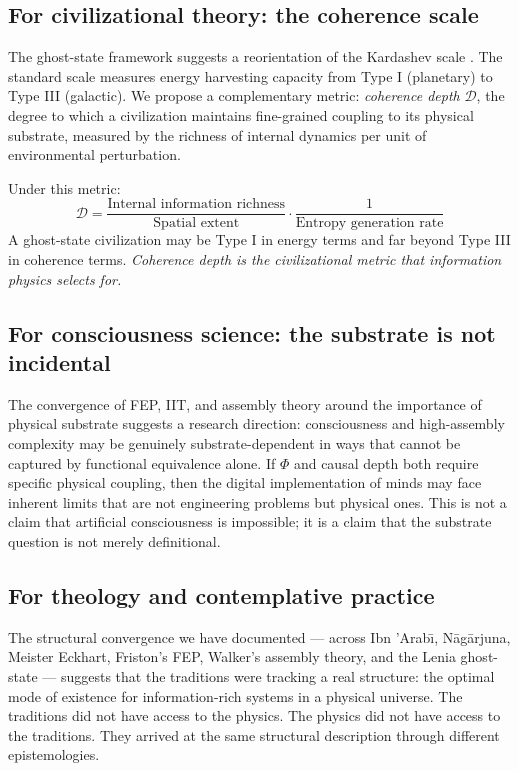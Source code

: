 \documentclass[12pt, a4paper]{article}
\begin{document}
\subsection{For civilizational theory: the coherence scale}

The ghost-state framework suggests a reorientation of the Kardashev scale \citep{kardashev1964}.
The standard scale measures energy harvesting capacity from Type I (planetary) to Type III
(galactic). We propose a complementary metric: \textit{coherence depth} $\mathcal{D}$, the
degree to which a civilization maintains fine-grained coupling to its physical substrate,
measured by the richness of internal dynamics per unit of environmental perturbation.

Under this metric:
\[
\mathcal{D} = \frac{\text{Internal information richness}}{\text{Spatial extent}} \cdot
\frac{1}{\text{Entropy generation rate}}
\]
A ghost-state civilization may be Type I in energy terms and far beyond Type III in coherence
terms. \textit{Coherence depth is the civilizational metric that information physics selects
for.}

\subsection{For consciousness science: the substrate is not incidental}

The convergence of FEP, IIT, and assembly theory around the importance of physical substrate
suggests a research direction: consciousness and high-assembly complexity may be genuinely
substrate-dependent in ways that cannot be captured by functional equivalence alone. If
$\Phi$ and causal depth both require specific physical coupling, then the digital
implementation of minds may face inherent limits that are not engineering problems but
physical ones. This is not a claim that artificial consciousness is impossible; it is a claim
that the substrate question is not merely definitional.

\subsection{For theology and contemplative practice}

The structural convergence we have documented --- across Ibn 'Arab\={\i}, N\={a}g\={a}rjuna,
Meister Eckhart, Friston's FEP, Walker's assembly theory, and the Lenia ghost-state ---
suggests that the traditions were tracking a real structure: the optimal mode of existence
for information-rich systems in a physical universe. The traditions did not have access to
the physics. The physics did not have access to the traditions. They arrived at the same
structural description through different epistemologies.
\end{document}
